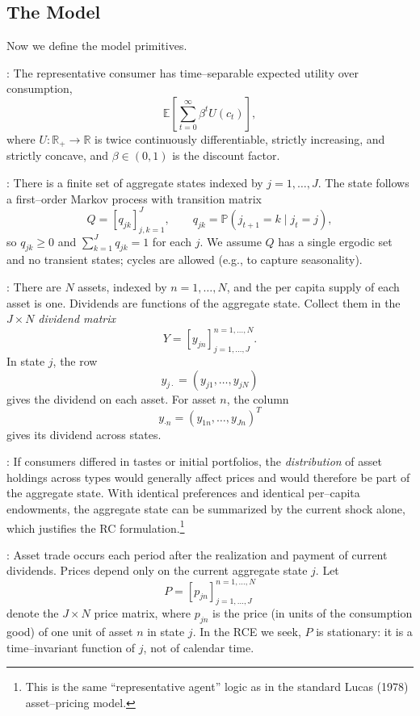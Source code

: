 \documentclass{tufte-handout}
\newcommand*\R{\mathbb{R}}
\newcommand*\E{\mathbb{E}}
\renewcommand*\P{\mathbb{P}}
\theoremstyle{definition}
\begin{document}
\subsection{The Model}

Now we define the model primitives.

: The representative consumer has time–separable expected utility over consumption,
\[
	\E\left[ \sum_{t=0}^{\infty} \beta^t U(c_t) \right],
\]
where $U:\R_+ \to \R$ is twice continuously differentiable, strictly increasing, and strictly concave, and $\beta \in (0,1)$ is the discount factor.

: There is a finite set of aggregate states indexed by $j = 1,\ldots,J$. The state follows a first–order Markov process with transition matrix
\[
	Q = [q_{jk}]_{j,k=1}^J, \qquad q_{jk} = \P(j_{t+1} = k \mid j_t = j),
\]
so $q_{jk} \ge 0$ and $\sum_{k=1}^J q_{jk} = 1$ for each $j$. We assume $Q$ has a single ergodic set and no transient states; cycles are allowed (e.g., to capture seasonality).

: There are $N$ assets, indexed by $n = 1,\ldots,N$, and the per capita supply of each asset is one. Dividends are functions of the aggregate state. Collect them in the $J \times N$ \emph{dividend matrix}
\[
	Y = [y_{jn}]_{j=1,\ldots,J}^{n=1,\ldots,N}.
\]
In state $j$, the row
\[
	y_{j\cdot} = (y_{j1},\ldots,y_{jN})
\]
gives the dividend on each asset. For asset $n$, the column
\[
	y_{\cdot n} = (y_{1n},\ldots,y_{Jn})^T
\]
gives its dividend across states.

: If consumers differed in tastes or initial portfolios, the \emph{distribution} of asset holdings across types would generally affect prices and would therefore be part of the aggregate state. With identical preferences and identical per–capita endowments, the aggregate state can be summarized by the current shock alone, which justifies the RC formulation.\footnote{This is the same “representative agent” logic as in the standard Lucas (1978) asset–pricing model.}

: Asset trade occurs each period after the realization and payment of current dividends. Prices depend only on the current aggregate state $j$. Let
\[
	P = [p_{jn}]_{j=1,\ldots,J}^{n=1,\ldots,N}
\]
denote the $J \times N$ price matrix, where $p_{jn}$ is the price (in units of the consumption good) of one unit of asset $n$ in state $j$. In the RCE we seek, $P$ is stationary: it is a time–invariant function of $j$, not of calendar time.
\end{document}

